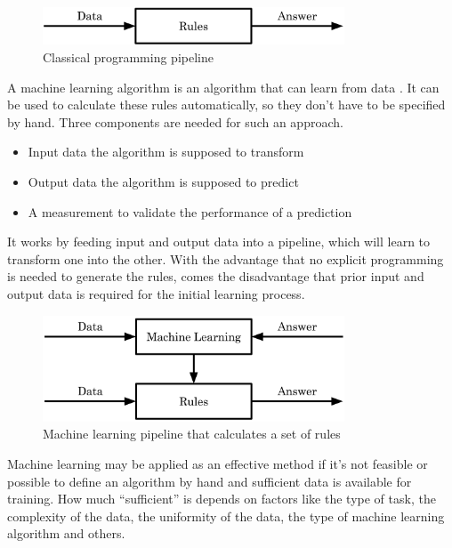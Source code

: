\begin{figure}[H]
\centering
\par
\includegraphics[width=0.8\textwidth]{imgs/classic_prog.png}
\caption{Classical programming pipeline}
\par
\end{figure}

A machine learning algorithm is an algorithm that can learn from data \cite{Goodfellow2016}. It can be used to calculate these rules automatically, so they don't have to be specified by hand. Three components are needed for such an approach.

\begin{itemize}
\item Input data the algorithm is supposed to transform
\item Output data the algorithm is supposed to predict
\item A measurement to validate the performance of a prediction
\end{itemize}

It works by feeding input and output data into a pipeline, which will learn to transform one into the other. With the advantage that no explicit programming is needed to generate the rules, comes the disadvantage that prior input and output data is required for the initial learning process.

\begin{figure}[H]
\centering
\par
\includegraphics[width=0.8\textwidth]{imgs/ml_pipeline.png}
\caption{Machine learning pipeline that calculates a set of rules}
\par
\end{figure}

Machine learning may be applied as an effective method if it's not feasible or possible to define an algorithm by hand and sufficient data is available for training. How much “sufficient” is depends on factors like the type of task, the complexity of the data, the uniformity of the data, the type of machine learning algorithm and others.


